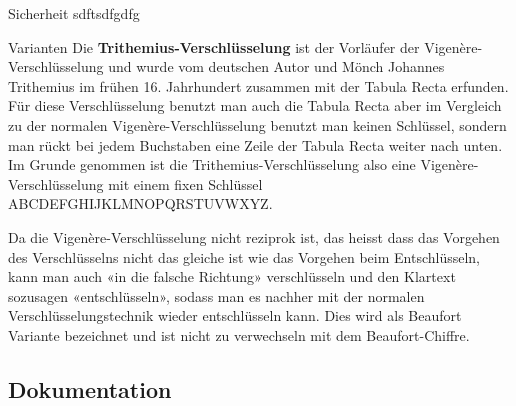 Sicherheit
sdftsdfgdfg

Varianten
Die \textbf{Trithemius-Verschlüsselung} ist der Vorläufer der Vigenère-Verschlüsselung und wurde vom deutschen Autor und Mönch Johannes Trithemius im frühen 16. Jahrhundert zusammen mit der Tabula Recta erfunden. Für diese Verschlüsselung benutzt man auch die Tabula Recta aber im Vergleich zu der normalen Vigenère-Verschlüsselung benutzt man keinen Schlüssel, sondern man rückt bei jedem Buchstaben eine Zeile der Tabula Recta weiter nach unten. Im Grunde genommen ist die Trithemius-Verschlüsselung also eine Vigenère-Verschlüsselung mit einem fixen Schlüssel ABCDEFGHIJKLMNOPQRSTUVWXYZ.

Da die Vigenère-Verschlüsselung nicht reziprok ist, das heisst dass das Vorgehen des Verschlüsselns nicht das gleiche ist wie das Vorgehen beim Entschlüsseln, kann man auch «in die falsche Richtung» verschlüsseln und den Klartext sozusagen «entschlüsseln», sodass man es nachher mit der normalen Verschlüsselungstechnik wieder entschlüsseln kann. Dies wird als Beaufort Variante bezeichnet und ist nicht zu verwechseln mit dem Beaufort-Chiffre.

\subsection{Dokumentation}



